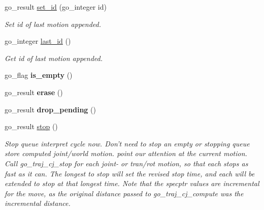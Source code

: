 \begin{DoxyCompactItemize}
\item 
go\-\_\-result \hyperlink{structgomotion_1_1go__motion__queue_a10c28cd42c87403852354d8a26e11204}{set\-\_\-id} (go\-\_\-integer id)
\begin{DoxyCompactList}\small\item\em Set id of last motion appended. \end{DoxyCompactList}\item 
go\-\_\-integer \hyperlink{structgomotion_1_1go__motion__queue_ab6be3f8589b1ed1d0cf9615c16d3f7cd}{last\-\_\-id} ()
\begin{DoxyCompactList}\small\item\em Get id of last motion appended. \end{DoxyCompactList}\item 
\hypertarget{structgomotion_1_1go__motion__queue_ad159c5ff1a51e68707caf4c6466da2cb}{go\-\_\-flag {\bfseries is\-\_\-empty} ()}\label{structgomotion_1_1go__motion__queue_ad159c5ff1a51e68707caf4c6466da2cb}

\item 
\hypertarget{structgomotion_1_1go__motion__queue_a0f48a4983551ffa4d5e53e3c62a965c6}{go\-\_\-result {\bfseries erase} ()}\label{structgomotion_1_1go__motion__queue_a0f48a4983551ffa4d5e53e3c62a965c6}

\item 
\hypertarget{structgomotion_1_1go__motion__queue_ac14fbfab39c746da1969390c50617746}{go\-\_\-result {\bfseries drop\-\_\-pending} ()}\label{structgomotion_1_1go__motion__queue_ac14fbfab39c746da1969390c50617746}

\item 
go\-\_\-result \hyperlink{structgomotion_1_1go__motion__queue_ad2fa3a736879c90c0ffbdf7bc0bc54c9}{stop} ()
\begin{DoxyCompactList}\small\item\em Stop queue interpret cycle now. Don't need to stop an empty or stopping queue store computed joint/world motion. point our attention at the current motion. Call go\-\_\-traj\-\_\-cj\-\_\-stop for each joint-\/ or tran/rot motion, so that each stops as fast as it can. The longest to stop will set the revised stop time, and each will be extended to stop at that longest time. Note that the specptr values are incremental for the move, as the original distance passed to go\-\_\-traj\-\_\-cj\-\_\-compute was the incremental distance. \end{DoxyCompactList}\end{DoxyCompactItemize}
